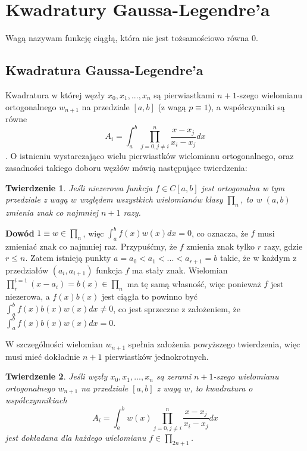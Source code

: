 \documentclass{article}
\newtheorem{theorem}{Twierdzenie}
\begin{document}
\section*{Kwadratury Gaussa-Legendre'a}
	Wagą nazywam funkcję ciągłą, która nie jest tożsamościowo równa 0.

\subsection*{Kwadratura Gaussa-Legendre'a}
Kwadratura w której węzły $x_0,x_1,...,x_n$ są pierwiastkami $n+1$-szego
wielomianu ortogonalnego $w_{n+1}$ na przedziale $[a,b]$ (z wagą $p\equiv 1$), a współczynniki są równe
\[A_i=\int_a^b \prod_{j=0,j\neq i}^n \frac{x-x_j}{x_i-x_j} dx\]. O istnieniu
wystarczająco wielu pierwiastków wielomianu ortogonalnego, oraz zasadności 
takiego doboru węzłów mówią następujące twierdzenia: 
\begin{theorem}
	Jeśli niezerowa funkcja $f\in C[a,b]$ jest ortogonalna w tym przedziale z wagą $w$ względem wszystkich wielomianów klasy $\prod_{n}$, to w $(a,b)$ zmienia znak co najmniej $n+1$ razy.
\end{theorem}
\textbf{Dowód} $1\equiv w \in \prod_{n}$, więc $\int_a^b f(x)w(x)dx = 0$, co oznacza, że $f$ musi zmieniać znak co najmniej raz. Przypuśćmy, że $f$ zmienia znak tylko $r$ razy, gdzie $r\le n $. Zatem istnieją punkty $a=a_0<a_1<...<a_{r+1}=b$ takie, że w każdym z przedziałów $(a_i,a_{i+1})$ funkcja $f$ ma stały znak. Wielomian $\prod_{r}^{i=1}(x-a_i) = b(x) \in \prod_{n}$ ma tę samą własność, więc ponieważ $f$ jest niezerowa, a $f(x)b(x)$ jest ciągła to powinno być $\int_{a}^{b} f(x)b(x)w(x)dx\neq 0$, co jest sprzeczne z założeniem, że $\int_{a}^{b}f(x)b(x)w(x)dx = 0$. \newline

W szczególności wielomian $w_{n+1}$ spełnia założenia powyższego twierdzenia, więc musi mieć dokładnie $n+1$ pierwiastków jednokrotnych.

\begin{theorem}
	Jeśli węzły $x_0,x_1,...,x_n$ są zerami $n+1$-szego wielomianu ortogonalnego $w_{n+1}$ na przedziale $[a,b]$ z wagą $w$, to kwadratura o współczynnikiach
	\[A_i=\int_a^b w(x)\prod_{j=0,j\neq i}^n \frac{x-x_j}{x_i-x_j} dx\] jest dokładana dla każdego wielomianu $f\in\prod_{2n+1}$.
\end{theorem}
\end{document}
